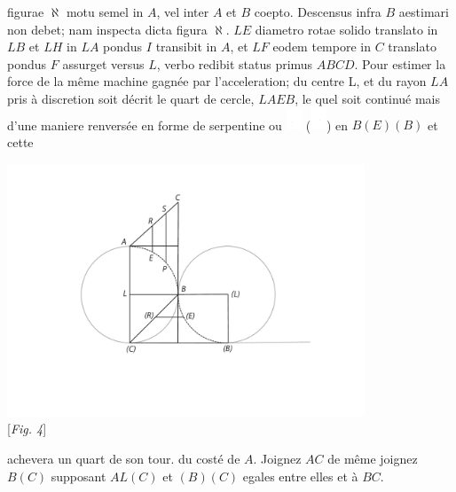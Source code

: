 \pend 
\pstart {} figurae $\aleph$ motu semel in $A$, vel inter $A$ et $B$ coepto. Descensus infra $B$ aestimari non debet; nam inspecta dicta figura $\aleph$. $LE$ diametro rotae solido translato in $LB$ et $LH$ in $LA$ pondus $I$ transibit in $A$, et $LF$ eodem tempore in $C$ translato pondus $F$ assurget versus $L$, verbo redibit status primus $ABCD$.
\pend 
\count{}
\pstart Pour estimer la force\protect{} de la m\^{e}me machine gagn\'{e}e par l'acceleration\protect{}; du centre L, et du rayon $LA$ pris \`{a} discretion soit d\'{e}crit le quart de cercle, $LAEB$, le quel soit continu\'{e} mais d'une maniere renvers\'{e}e en forme de serpentine ou \includegraphics[width=0.035\textwidth]{images/lh0351009_004r-d6.pdf} (\includegraphics[width=0.035\textwidth]{images/lh0351009_004r-d7.pdf}) en $B(E)(B)$ et cette 
\pend
\begin{center}                    
\includegraphics[width=0.8\textwidth]{images/lh0351009_004r-d4.pdf}\\
\hspace{20mm}[\textit{Fig. 4}]
\end{center}
\count{}
\pstart
\noindent achevera un quart de son tour.  du cost\'{e} de $A$. Joignez $AC$ de m\^{e}me joignez $B(C)$ supposant $AL(C)$ et $(B)(C)$ egales entre elles et \`{a} $BC$. 
